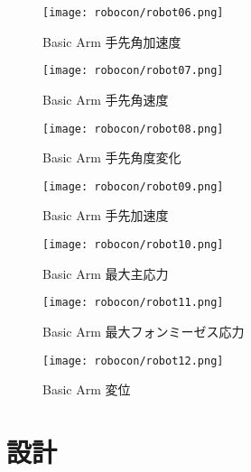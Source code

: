 \documentclass[10pt,b5paper,papersize,dvipdfmx]{jsbook}
\begin{document}
\begin{figure}[H]
  \centering
  \texttt{[image: robocon/robot06.png]}
  \caption{Basic Arm 手先角加速度}
  \label{Basic Arm 手先角加速度}
\end{figure}
\begin{figure}[H]
  \centering
  \texttt{[image: robocon/robot07.png]}
  \caption{Basic Arm 手先角速度}
  \label{fig:Basic Arm 手先角速度}
\end{figure}
\begin{figure}[H]
  \centering
  \texttt{[image: robocon/robot08.png]}
  \caption{Basic Arm 手先角度変化}
  \label{fig:Basic Arm 手先角度変化}
\end{figure}
\begin{figure}[H]
  \centering
  \texttt{[image: robocon/robot09.png]}
  \caption{Basic Arm 手先加速度}
  \label{fig:Basic Arm 手先加速度}
\end{figure}
\begin{figure}[H]
  \centering
  \texttt{[image: robocon/robot10.png]}
  \caption{Basic Arm 最大主応力}
  \label{fig:Basic Arm 最大主応力}
\end{figure}
\begin{figure}[H]
  \centering
  \texttt{[image: robocon/robot11.png]}
  \caption{Basic Arm 最大フォンミーゼス応力}
  \label{fig:Basic Arm 最大フォンミーゼス応力}
\end{figure}
\begin{figure}[H]
  \centering
  \texttt{[image: robocon/robot12.png]}
  \caption{Basic Arm 変位}
  \label{fig:Basic Arm 変位}
\end{figure}
\section{設計}
\end{document}
